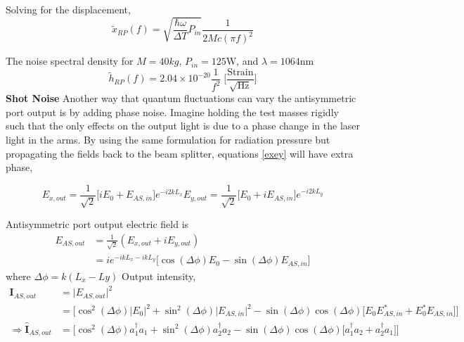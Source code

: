 		Solving for the displacement,
		\begin{equation}
		\tilde{x}_{RP}(f) = \sqrt{\frac{\hbar \omega}{\Delta T} P_{in}} \frac{1}{2Mc (\pi f)^2}
		\end{equation}
	
		The noise spectral density for $M=40kg$, $P_{in}=125$W, and $\lambda=1064$nm
		\begin{equation}
		\tilde{h}_{RP}(f) = 2.04\times 10^{-20} \frac{1}{f^2} \; \bigg[ \frac{\text{Strain}}{\sqrt{\text{Hz}}}\bigg]
		\end{equation}
		\textbf{Shot Noise}
		Another way that quantum fluctuations can vary the antisymmetric port output is by adding phase noise.  Imagine holding the test masses rigidly such that the only effects on the output light is due to a phase change in the laser light in the arms. By using the same formulation for radiation pressure but propagating the fields back to the beam splitter, equations \ref{exey} will have extra phase,
		
		\begin{subequations}\label{exeyout}
		\begin{equation}
		E_{x,out} = \frac{1}{\sqrt{2}} \bigg[ iE_0 +   E_{AS,in} \bigg] e^{-i2kL_x}
		\end{equation}
		\begin{equation}
		E_{y,out} = \frac{1}{\sqrt{2}} \bigg[  E_0 + i E_{AS,in} \bigg] e^{-i2kL_y}
		\end{equation}
		\end{subequations}
		
		Antisymmetric port output electric field is
		\begin{equation}
		\begin{aligned}
		E_{AS,out} 	&= \frac{1}{\sqrt{2}} (E_{x,out} + iE_{y,out})\\
					&= i e^{-ikL_x-ikL_y} \big[\cos(\Delta \phi) E_0 - \sin(\Delta \phi) E_{AS,in}\big]
		\end{aligned}
		\end{equation}
		where $\Delta \phi = k(L_x-Ly)$
		Output intensity,
		\begin{equation}
		\begin{aligned}
		\mathbf{I}_{AS,out} 		&= \vert E_{AS,out}\vert^2 \\
									&= \bigg[ \cos^2(\Delta \phi)\vert E_0\vert^2 + \sin^2(\Delta\phi)\vert E_{AS,in}\vert^2 - \sin(\Delta\phi)\cos(\Delta\phi) \big[E_0 E^*_{AS,in} + E_0^* E_{AS,in}\big] \bigg]\\
		\Rightarrow	
		\hat{\mathbf{I}}_{AS,out} 	&= \bigg[ \cos^2(\Delta \phi)a_1^{\dagger}a_1 + \sin^2(\Delta\phi)a_2^{\dagger}a_2 - \sin(\Delta\phi)\cos(\Delta \phi) \big[a_1^{\dagger}a_2 + a_2^{\dagger}a_1 \big] \bigg]\\	
		\end{aligned}
		\end{equation}
		
